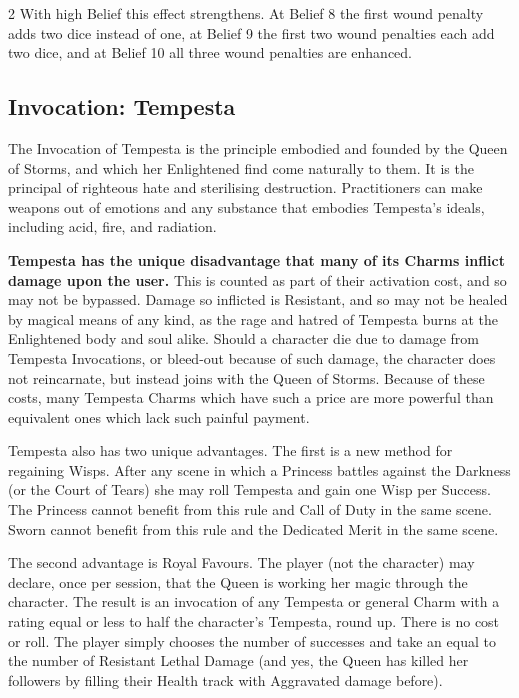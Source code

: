 \begin{multicols}{2}
With high Belief this effect strengthens. At Belief 8 the first wound penalty adds two dice instead of one, at Belief 9 the first two wound penalties each add two dice, and at Belief 10 all three wound penalties are enhanced. 

\subsection*{Invocation: Tempesta}

The Invocation of Tempesta is the principle embodied and founded by the Queen of Storms, and which her Enlightened find come naturally to them. It is the principal of righteous hate and sterilising destruction. Practitioners can make weapons out of emotions and any substance that embodies Tempesta's ideals, including acid, fire, and radiation.

\textbf{Tempesta has the unique disadvantage that many of its Charms inflict damage upon the user.} This is counted as part of their activation cost, and so may not be bypassed. Damage so inflicted is Resistant, and so may not be healed by magical means of any kind, as the rage and hatred of Tempesta burns at the Enlightened body and soul alike. Should a character die due to damage from Tempesta Invocations, or bleed-out because of such damage, the character does not reincarnate, but instead joins with the Queen of Storms. Because of these costs, many Tempesta Charms which have such a price are more powerful than equivalent ones which lack such painful payment.

Tempesta also has two unique advantages. The first is a new method for regaining Wisps. After any scene in which a Princess battles against the Darkness (or the Court of Tears) she may roll Tempesta and gain one Wisp per Success. The Princess cannot benefit from this rule and Call of Duty in the same scene. Sworn cannot benefit from this rule and the Dedicated Merit in the same scene. 

The second advantage is Royal Favours. The player (not the character) may declare, once per session, that the Queen is working her magic through the character. The result is an invocation of any Tempesta or general Charm with a rating equal or less to half the character's Tempesta, round up. There is no cost or roll. The player simply chooses the number of successes and take an equal to the number of Resistant Lethal Damage (and yes, the Queen has killed her followers by filling their Health track with Aggravated damage before). 


\end{multicols}
